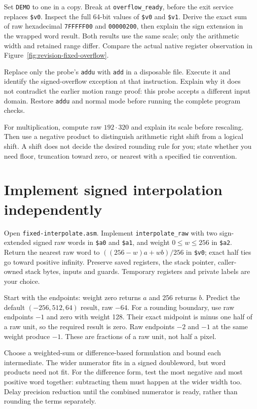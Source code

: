 Set \texttt{DEMO} to one in a copy. Break at \texttt{overflow\_ready}, before the
exit service replaces \texttt{\$v0}. Inspect the full 64-bit values of
\texttt{\$v0} and \texttt{\$v1}. Derive the exact sum of raw hexadecimal
\texttt{7FFFFF00} and \texttt{00000200}, then explain the sign extension in the
wrapped word result. Both results use the same scale; only the arithmetic width
and retained range differ. Compare the actual native register observation in
Figure~\ref{fig:revision-fixed-overflow}.



Replace only the probe's \texttt{addu} with \texttt{add} in a disposable file.
Execute it and identify the signed-overflow exception at that instruction.
Explain why it does not contradict the earlier motion range proof: this probe
accepts a different input domain. Restore \texttt{addu} and normal mode before
running the complete program checks.

For multiplication, compute raw $192\cdot320$ and explain its scale before
rescaling. Then use a negative product to distinguish arithmetic right shift
from a logical shift. A shift does not decide the desired rounding rule for you;
state whether you need floor, truncation toward zero, or nearest with a specified
tie convention.

\section{Implement signed interpolation independently}

Open \texttt{fixed-interpolate.asm}. Implement \texttt{interpolate\_raw} with
two sign-extended signed raw words in \texttt{\$a0} and \texttt{\$a1}, and
weight $0\leq w\leq256$ in \texttt{\$a2}. Return the nearest raw word to
$((256-w)a+wb)/256$ in \texttt{\$v0}; exact half ties go toward positive infinity.
Preserve saved registers, the stack pointer, caller-owned stack bytes, inputs
and guards. Temporary registers and private labels are your choice.

Start with the endpoints: weight zero returns $a$ and 256 returns $b$. Predict
the default $(-256,512,64)$ result, raw $-64$. For a rounding boundary, use raw
endpoints $-1$ and zero with weight 128. Their exact midpoint is minus one half
of a raw unit, so the required result is zero. Raw endpoints $-2$ and $-1$ at the
same weight produce $-1$. These are fractions of a raw unit, not half a pixel.

Choose a weighted-sum or difference-based formulation and bound each intermediate.
The wider numerator fits in a signed doubleword, but word products need not fit.
For the difference form, test the most negative and most positive word together:
subtracting them must happen at the wider width too. Delay precision reduction
until the combined numerator is ready, rather than rounding the terms separately.

